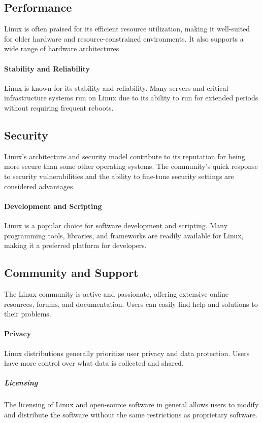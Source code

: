 \documentclass{article}
\begin{document}
\subsection{Performance}
Linux is often praised for its efficient resource utilization, making it well-suited for older hardware and resource-constrained environments. It also supports a wide range of hardware architectures.


\paragraph{Stability and  Reliability}
Linux is known for its stability and reliability. Many servers and critical infrastructure systems run on Linux due to its ability to run for extended periods without requiring frequent reboots.

\subsection{Security}
 Linux's architecture and security model contribute to its reputation for being more secure than some other operating systems. The community's quick response to security vulnerabilities and the ability to fine-tune security settings are considered advantages.


\paragraph{Development and Scripting}
 Linux is a popular choice for software development and scripting. Many programming tools, libraries, and frameworks are readily available for Linux, making it a preferred platform for developers.

\subsection{Community and Support}
 The Linux community is active and passionate, offering extensive online resources, forums, and documentation. Users can easily find help and solutions to their problems.

\paragraph{Privacy}
Linux distributions generally prioritize user privacy and data protection. Users have more control over what data is collected and shared.

\subparagraph{Licensing}
The licensing of Linux and open-source software in general allows users to modify and distribute the software without the same restrictions as proprietary software.
\end{document}
